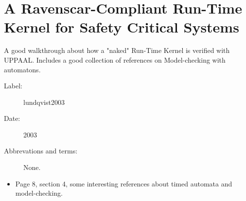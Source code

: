 \section{A Ravenscar-Compliant Run-Time Kernel for Safety Critical Systems}
A good walkthrough about how a "naked" Run-Time Kernel is verified with UPPAAL.
Includes a good collection of references on Model-checking with automatons.

\begin{description}
    \item[Label:] lundqvist2003 \cite{lundqvist2003}
    \item[Date:] 2003
    \item[Abbrevations and terms:] None.
\end{description}

\begin{itemize}
    \item Page 8, section 4, some interesting references about timed automata
        and model-checking.
\end{itemize}
%
%
%
%
